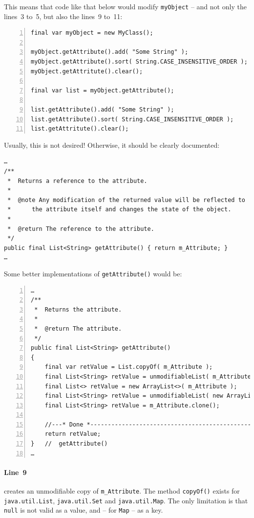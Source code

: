 \documentclass[11pt,a4paper, titlepage, parskip=half, headsepline, footsepline, cleardoublepage=current, headheight=1cm]{scrbook}
\begin{document}
This means that code like that below would modify \lstinline|myObject| – and not only the lines~3 to~5, but also the lines~9 to~11:
\begin{lstlisting}[numbers=left]
final var myObject = new MyClass();

myObject.getAttribute().add( "Some String" );
myObject.getAttribute().sort( String.CASE_INSENSITIVE_ORDER );
myObject.getAttritute().clear();

final var list = myObject.getAttribute();

list.getAttribute().add( "Some String" );
list.getAttribute().sort( String.CASE_INSENSITIVE_ORDER );
list.getAttritute().clear();
\end{lstlisting}
Usually, this is not desired! Otherwise, it should be clearly documented: 
\begin{lstlisting}
…
/**
 *  Returns a reference to the attribute.
 * 
 *  @note Any modification of the returned value will be reflected to
 *      the attribute itself and changes the state of the object.
 * 
 *  @return The reference to the attribute.
 */ 
public final List<String> getAttribute() { return m_Attribute; }
…
\end{lstlisting}

Some better implementations of \lstinline|getAttribute()| would be:
\begin{lstlisting}[numbers=left]
…
/**
 *  Returns the attribute.
 * 
 *  @return The attribute.
 */ 
public final List<String> getAttribute() 
{ 
	final var retValue = List.copyOf( m_Attribute );
	final List<String> retValue = unmodifiableList( m_Attribute );
	final List<> retValue = new ArrayList<>( m_Attribute );
	final List<String> retValue = unmodifiableList( new ArrayList<>( m_Attribute ) );
	final List<String> retValue = m_Attribute.clone();

    //---* Done *----------------------------------------------------
    return retValue;
}   //  getAttribute()
…
\end{lstlisting}

\paragraph{Line~9} creates an unmodifiable copy of \lstinline|m_Attribute|. The method \lstinline|copyOf()| exists for \lstinline|java.util.List|, \lstinline|java.util.Set|\autocite{ORACLE_DOC_SET_INTERFACE} and \lstinline|java.util.Map|. The only limitation is that \lstinline|null| is not valid as a value, and – for \lstinline|Map| – as a key.
\end{document}
